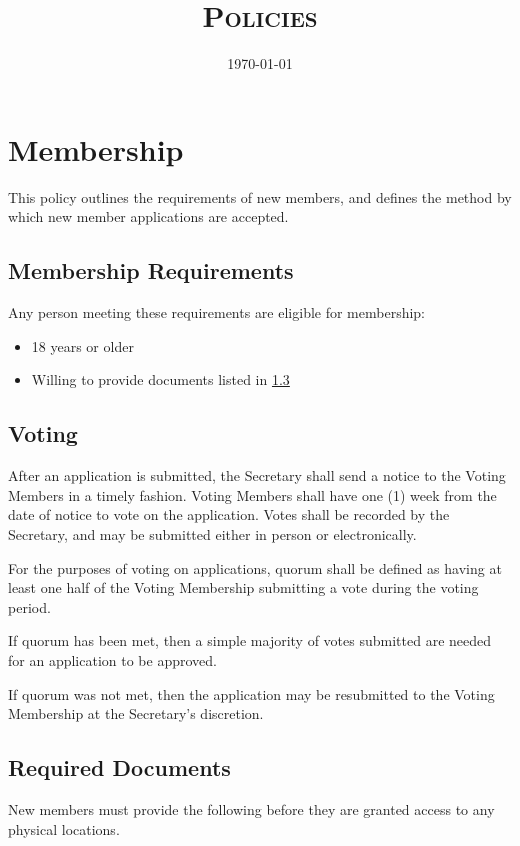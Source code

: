 \documentclass[10pt,letterpaper,titlepage]{article}
\title{%
    \textsc{\LARGE \corpname \\
    \Large Policies
    }
}
\date{\today}
\author{}
\begin{document}
\maketitle

\tableofcontents
\newpage

\section{Membership}
This policy outlines the requirements of new members, and defines the method by 
which new member applications are accepted.

\subsection{Membership Requirements}

Any person meeting these requirements are eligible for membership:
\begin{itemize}
    \item 18 years or older
    \item Willing to provide documents listed in \ref{memberdocs}
\end{itemize}

\subsection{Voting}
After an application is submitted, the Secretary shall send a notice to the 
Voting Members in a timely fashion. Voting Members shall have one (1) week from 
the date of notice to vote on the application. Votes shall be recorded by the 
Secretary, and may be submitted either in person or electronically.

For the purposes of voting on applications, quorum shall be defined as having at
least one half of the Voting Membership submitting a vote during the voting 
period.

If quorum has been met, then a simple majority of votes submitted are needed for
an application to be approved.

If quorum was not met, then the application may be resubmitted to the Voting 
Membership at the Secretary's discretion.

\subsection{Required Documents}
\label{memberdocs}

New members must provide the following before they are granted access to any 
physical locations.
\end{document}
